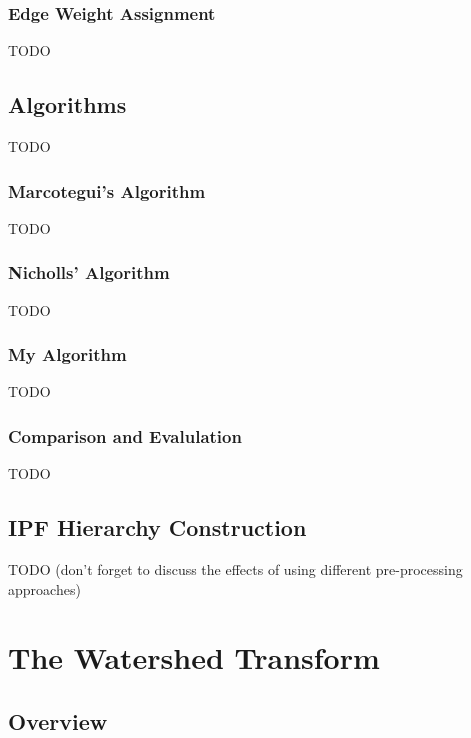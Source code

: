 \subsubsection{Edge Weight Assignment}

TODO

\subsection{Algorithms}

TODO

\subsubsection{Marcotegui's Algorithm}

TODO

\subsubsection{Nicholls' Algorithm}

TODO

\subsubsection{My Algorithm}
\label{subsubsec:segmentation-waterfall-myalgorithm}

TODO

\subsubsection{Comparison and Evalulation}

TODO

\subsection{IPF Hierarchy Construction}

TODO (don't forget to discuss the effects of using different pre-processing approaches)

\fi

\iffalse

\section{The Watershed Transform}

\subsection{Overview}

